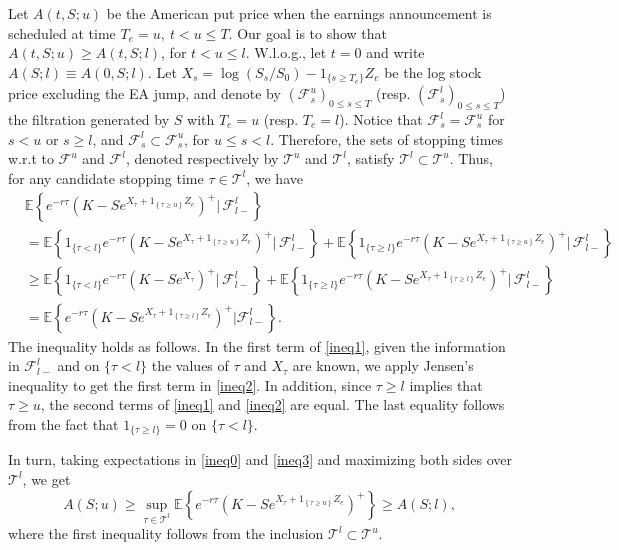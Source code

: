 \documentclass[11pt]{article}
\numberwithin{equation}{section}
\numberwithin{theorem}{section}
\def\F{\mathcal{F}}
\begin{document}
Let $A\left(t,S;u\right)$ be the American put price when the earnings announcement is  scheduled at time $T_{e}=u,\ t<u\leq T$. Our goal is to show that $A\left(t,S;u\right)\geq A\left(t,S;l\right)$, for $t< u\leq l$.
W.l.o.g., let $t=0$ and write $A\left(S;l\right)\equiv A\left(0,S;l\right)$. Let $X_s = \log(S_s/S_0)  - 1_{\{ s\ge T_e\}}Z_e$ be the log stock price excluding the EA jump, and denote by  $(\mathcal{F}^u_s)_{0 \le s \le T}$ (resp.  $(\mathcal{F}^l_s)_{0 \le s \le T}$) the filtration generated by $S$  with  $T_e=u$ (resp. $T_e = l$). Notice that $\mathcal{F}^l_s =  \mathcal{F}^u_s$ for $s<u$ or $s\ge l$, and  $\mathcal{F}^l_s\subset \mathcal{F}^u_s$, for $  u \le s < l$. Therefore,  the sets of   stopping times w.r.t to $\mathcal{F}^u$ and $\mathcal{F}^l$, denoted respectively by  $\mathcal{T}^u$ and $\mathcal{T}^l$, satisfy $\mathcal{T}^l\subset \mathcal{T}^u$. Thus, for any  candidate  stopping time $\tau\in \mathcal{T}^l$, we have 
\begin{align}
&\mathbb{E}\left\{ e^{-r\tau}\left(K-Se^{X_{\tau}+1_{\left\{ \tau\geq u\right\} }Z_{e}}\right)^{+} | \,\F^l_{l-}  \right\}\label{ineq0}\\
&=\mathbb{E}\left\{ 1_{\{ \tau <l \}}e^{-r\tau}\left(K-Se^{X_{\tau}+1_{\left\{ \tau\geq u\right\} }Z_{e}}\right)^{+} | \,\F^l_{l-}  \right\}  + 
\mathbb{E}\left\{ 1_{\{ \tau  \ge l\}}e^{-r\tau}\left(K-Se^{X_{\tau}+1_{\left\{ \tau\geq u\right\} }Z_{e}}\right)^{+} | \,\F^l_{l-}  \right\} \label{ineq1}  \\
&\ge \mathbb{E}\left\{ 1_{\{ \tau <l \}}e^{-r\tau}\left(K-Se^{X_{\tau}}\right)^{+} | \,\F^l_{l-}  \right\}  + 
\mathbb{E}\left\{ 1_{\{ \tau  \ge l\}}e^{-r\tau}\left(K-Se^{X_{\tau}+1_{\left\{ \tau\geq l\right\} }Z_{e}}\right)^{+} | \,\F^l_{l-}  \right\}\label{ineq2}  \\&= \mathbb{E}\left\{e^{-r\tau}\left(K-Se^{X_{\tau}+1_{\left\{ \tau\geq l\right\} }Z_{e}}\right)^{+} | \F^l_{l-} \right\}.
\label{ineq3}
\end{align}
The inequality  holds as follows.  In  the first term of \eqref{ineq1}, given the information in $\F^l_{l-}$ and on $\{\tau < l\}$ the values of $\tau$ and $X_\tau$ are known, we   apply  Jensen's inequality to get the first term in \eqref{ineq2}. In addition, since  $\tau \ge l$  implies that $\tau \ge u$,   the second terms of \eqref{ineq1} and \eqref{ineq2} are equal. The last equality follows from the fact that $1_{\{ \tau \ge l\}}=0$ on $\{ \tau <l\}$. 

In turn, taking expectations in \eqref{ineq0} and \eqref{ineq3} and maximizing  both sides over   $\mathcal{T}^l$,  we get  \[A\left(S;u\right)\geq \sup_{\tau  \in \mathcal{T}^l} \mathbb{E}\left\{ e^{-r\tau}\left(K-Se^{X_{\tau}+1_{\left\{ \tau\geq u\right\} }Z_{e}}\right)^{+}  \right\}  \ge  A\left(S;l\right),\]where the first inequality follows from the inclusion $ \mathcal{T}^l\subset \mathcal{T}^u$.  
\end{document}
